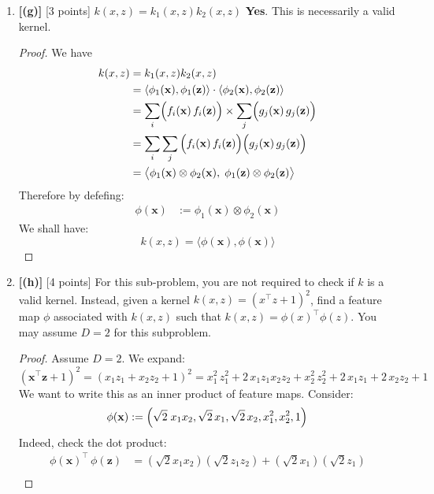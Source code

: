 \documentclass[lang=cn,11pt]{elegantbook}
\begin{document}
\begin{enumerate}
\begin{proof}
Also, from the conclusion of (a) we know that addition of two kernels is a kernel.  \(k(x, z)   = p\!\bigl(k_1(\mathbf{x}, \mathbf{z})\bigr)  = \sum_{m=0}^M c_m \bigl(k_1(\mathbf{x}, \mathbf{z})\bigr)^m\) is a kernel.
\end{proof}
    \item \textbf{[(g)]} [3 points] $k(x, z) = k_1(x, z) k_2(x, z)$
\textbf{Yes}. This is necessarily a valid kernel.
\begin{proof}
We have
\begin{align}
    k(x, z) &= k_1(x, z) k_2(x, z) \\
    & =  \langle \phi_1(\mathbf{x}), \phi_1(\mathbf{z}) \rangle \cdot
           \langle \phi_2(\mathbf{x}), \phi_2(\mathbf{z}) \rangle  \\
        &=   \sum_{i} \Bigl(f_i(\mathbf{x})\,f_i(\mathbf{z})\Bigr)\times 
        \sum_{j}\Bigl(g_j(\mathbf{x})\,g_j(\mathbf{z})\Bigr)\\
        &= \sum_{i} \sum_{j}
   \Big( f_i(\mathbf{x})\,f_i(\mathbf{z}) \Big) 
   \Big( g_j(\mathbf{x})\,g_j(\mathbf{z}) \Big)\\
   & = \bigl\langle \phi_1(\mathbf{x}) \otimes \phi_2(\mathbf{x}), \;
            \phi_1(\mathbf{z}) \otimes \phi_2(\mathbf{z})
 \bigr\rangle
\end{align}
Therefore by defefing: \begin{align}
\phi(\mathbf{x}) &:= \phi_1(\mathbf{x}) \otimes \phi_2(\mathbf{x}) 
\end{align}
We shall have: \[
 k(x, z) = \bigl\langle \phi(\mathbf{x}), \phi(\mathbf{x}) \bigl\rangle 
\]
\end{proof}
    \item \textbf{[(h)] }[4 points] For this sub-problem, you are not required to check if $k$ is a valid kernel. Instead, given a kernel $k(x, z) = (x^\top z + 1)^2$, find a feature map $\phi$ associated with $k(x, z)$ such that $k(x, z) = \phi(x)^\top \phi(z)$. You may assume $D = 2$ for this subproblem.
\begin{proof}
Assume $D=2$. We expand: \[
  (\mathbf{x}^{\top}\mathbf{z} + 1)^2 = (x_1z_1 + x_2z_2 + 1)^2   = x_1^2\,z_1^2      + 2\,x_1z_1x_2z_2      + x_2^2\,z_2^2     + 2\,x_1z_1    + 2\,x_2z_2       + 1\]
We want to write this as an inner product of feature maps.  Consider:
\[
  \phi(\mathbf{x}) := \Bigl(\sqrt{2}\;x_1x_2,\sqrt{2}\,x_1,\sqrt{2}\,x_2,x_1^2,x_2^2,1\Bigr)
\]
Indeed, check the dot product:
\begin{align}
\phi(\mathbf{x})^\top\,\phi(\mathbf{z}) &= (\sqrt{2}x_1x_2)(\sqrt{2}z_1z_2)  +(\sqrt{2}x_1)(\sqrt{2}z_1) \\

\end{align}
\end{proof}
\end{enumerate}
\end{document}
